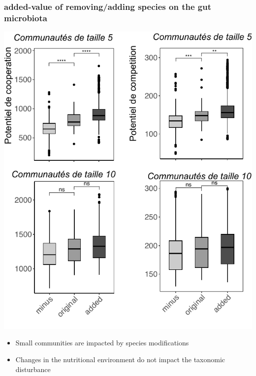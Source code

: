 \documentclass[8pt,usenames,dvipsnames]{beamer}
\begin{document}
\begin{frame}
\frametitle{added-value of removing/adding species on the gut microbiota}
\begin{minipage}{0.6\textwidth}
\includegraphics[width=\textwidth]{figures/added-value.pdf}
\end{minipage}%
\hspace{0.2cm}
\hfill
\begin{minipage}{0.37\textwidth}
\begin{block}{}
\begin{itemize}
\item Small communities are impacted by species modifications
\item Changes in the nutritional environment do not impact the taxonomic disturbance
\end{itemize}
\end{block}
\end{minipage}
\end{frame}
\end{document}
